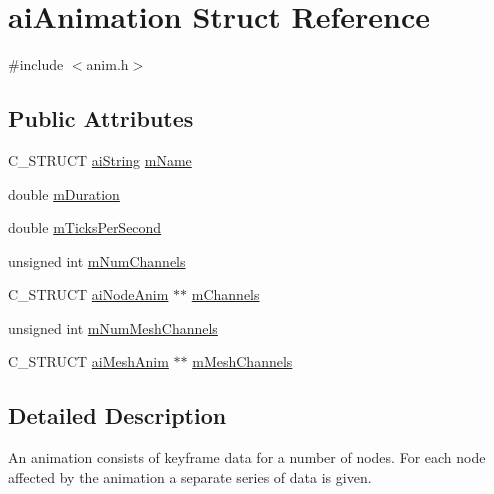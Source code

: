 \hypertarget{structaiAnimation}{\section{ai\-Animation \-Struct \-Reference}
\label{structaiAnimation}
}


{\ttfamily \#include $<$anim.\-h$>$}

\subsection*{\-Public \-Attributes}
\begin{DoxyCompactItemize}
\item 
\-C\-\_\-\-S\-T\-R\-U\-C\-T \hyperlink{structaiString}{ai\-String} \hyperlink{structaiAnimation_a1be7d78d88694173a7ceef658fea77f1}{m\-Name}
\item 
double \hyperlink{structaiAnimation_ae2bbc49320b4b75c05e23e0ab704ece7}{m\-Duration}
\item 
double \hyperlink{structaiAnimation_afd26a40c3f16b6aa6e150effa3eaeab1}{m\-Ticks\-Per\-Second}
\item 
unsigned int \hyperlink{structaiAnimation_aebfccf9a9aefa6084566d21e8a30b7e5}{m\-Num\-Channels}
\item 
\-C\-\_\-\-S\-T\-R\-U\-C\-T \hyperlink{structaiNodeAnim}{ai\-Node\-Anim} $\ast$$\ast$ \hyperlink{structaiAnimation_a89244bb68b725ffbb85137174c28e757}{m\-Channels}
\item 
unsigned int \hyperlink{structaiAnimation_ac43aacd8502020174e553501f0b6bf5f}{m\-Num\-Mesh\-Channels}
\item 
\-C\-\_\-\-S\-T\-R\-U\-C\-T \hyperlink{structaiMeshAnim}{ai\-Mesh\-Anim} $\ast$$\ast$ \hyperlink{structaiAnimation_af05138121dbde8b31aa031505b454c85}{m\-Mesh\-Channels}
\end{DoxyCompactItemize}


\subsection{\-Detailed \-Description}
\-An animation consists of keyframe data for a number of nodes. \-For each node affected by the animation a separate series of data is given. 

